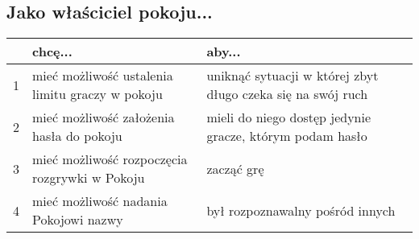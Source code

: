\subsection{Jako właściciel pokoju...}
\begin{center}
    \begin{tabular}{ | l | p{6cm} | p{6cm} |}
    \hline
     & \textbf{chcę...} & \textbf{aby...} \\ \hline
    1 & mieć możliwość ustalenia limitu graczy w pokoju & uniknąć sytuacji w której zbyt długo czeka się na swój ruch \\ \hline
    2 & mieć możliwość założenia hasła do pokoju & mieli do niego dostęp jedynie gracze, którym podam hasło \\ \hline
    3 & mieć możliwość rozpoczęcia rozgrywki w Pokoju & zacząć grę \\ \hline
    4 & mieć możliwość nadania Pokojowi nazwy & był rozpoznawalny pośród innych \\ \hline
    \end{tabular}
\end{center}

